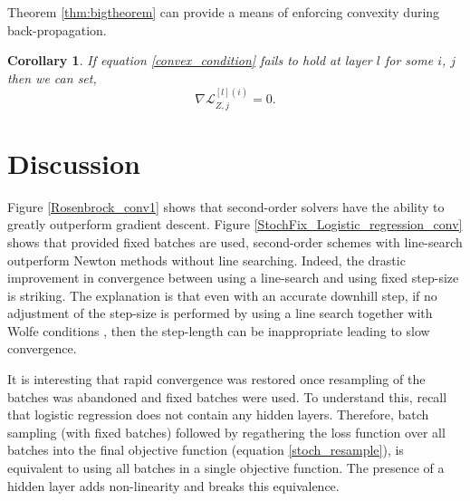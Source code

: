 \documentclass[nohyperref]{article}
\theoremstyle{plain}
\newtheorem{corollary}[theorem]{Corollary}
\theoremstyle{definition}
\theoremstyle{remark}
\begin{document}
Theorem \ref{thm:bigtheorem} can provide a means of enforcing convexity during back-propagation. 
\begin{corollary}
If equation \ref{convex_condition} fails to hold at layer $l$ for some $i$, $j$ then we can set,
\begin{equation}
\nabla \mathcal{L}^{[l](i)}_{Z,j} =0.
\end{equation}
\end{corollary}

\section{Discussion}

Figure \ref{Rosenbrock_conv1} shows that second-order solvers have the ability to greatly outperform gradient descent. Figure \ref{StochFix_Logistic_regression_conv} shows that provided fixed batches are used, second-order schemes with line-search outperform Newton methods without line searching. Indeed, the drastic improvement in convergence between using a line-search and using fixed step-size is striking. The explanation is that even with an accurate downhill step, if no adjustment of the step-size is performed by using a line search together with Wolfe conditions \citep[see][]{Nocedal:Wright}, then the step-length can be inappropriate leading to slow convergence. 
 
It is interesting that rapid convergence was restored once resampling of the batches was abandoned and fixed batches were used. To understand this, recall that logistic regression does not contain any hidden layers. Therefore, batch sampling (with fixed batches) followed by regathering the loss function over all batches into the final objective function (equation \ref{stoch_resample}), is equivalent to using all batches in a single objective function. The presence of a hidden layer adds non-linearity and breaks this equivalence.
\end{document}
